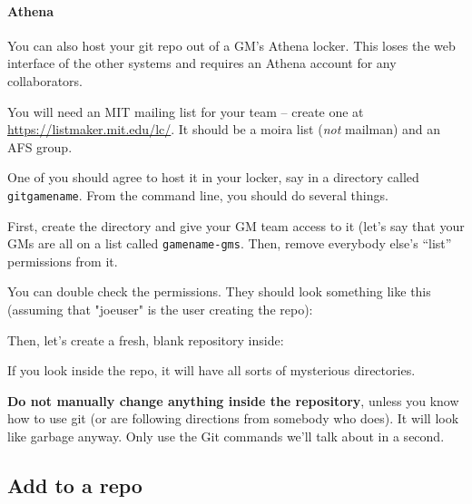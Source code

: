 \documentclass[green]{testgame}
\begin{document}
\paragraph*{Athena} You can also host your git repo out of a GM's Athena locker. This loses the web interface of the other systems and requires an Athena account for any collaborators.

You will need an MIT mailing list for your team -- create one at \url{https://listmaker.mit.edu/lc/}.  It should be a moira list (\emph{not} mailman) and an AFS group.

One of you should agree to host it in your locker, say in a directory called \texttt{gitgamename}. From the command line, you should do several things.

First, create the directory and give your GM team access to it (let's
say that your GMs are all on a list called \texttt{gamename-gms}. Then,
remove everybody else's ``list'' permissions from it.


You can double check the permissions. They should look something like
this (assuming that "joeuser" is the user creating the repo):


Then, let's create a fresh, blank repository inside:


If you look inside the repo, it will have all sorts of mysterious directories.


\textbf{Do not manually change anything inside the repository}, unless you know how to use git (or are following directions from somebody who does). It will look like garbage anyway. Only use the Git commands we'll talk about in a second.

\subsection{Add \gametex{} to a repo}
\end{document}
